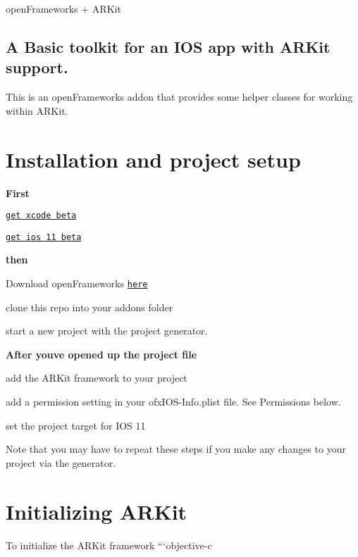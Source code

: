open\+Frameworks + A\+R\+Kit

\subsection*{A Basic toolkit for an I\+OS app with A\+R\+Kit support.}

This is an open\+Frameworks addon that provides some helper classes for working within A\+R\+Kit.

\section*{Installation and project setup}

{\bfseries First}
\begin{DoxyItemize}
\item \href{https://developer.apple.com/download/}{\tt get xcode beta}
\item \href{https://beta.apple.com/sp/betaprogram/guide}{\tt get ios 11 beta}
\end{DoxyItemize}

{\bfseries then}
\begin{DoxyItemize}
\item Download open\+Frameworks \href{http://openframeworks.cc/versions/v0.9.8/of_v0.9.8_ios_release.zip}{\tt here}
\item clone this repo into your addons folder
\item start a new project with the project generator.
\end{DoxyItemize}

{\bfseries After you\textquotesingle{}ve opened up the project file}
\begin{DoxyItemize}
\item add the A\+R\+Kit framework to your project
\end{DoxyItemize}




\begin{DoxyItemize}
\item add a permission setting in your {\ttfamily ofx\+I\+O\+S-\/\+Info.\+plist} file. See Permissions below.
\item set the project target for I\+OS 11 
\end{DoxyItemize}

Note that you may have to repeat these steps if you make any changes to your project via the generator.

\section*{Initializing A\+R\+Kit}

To initialize the A\+R\+Kit framework ```objective-\/c 